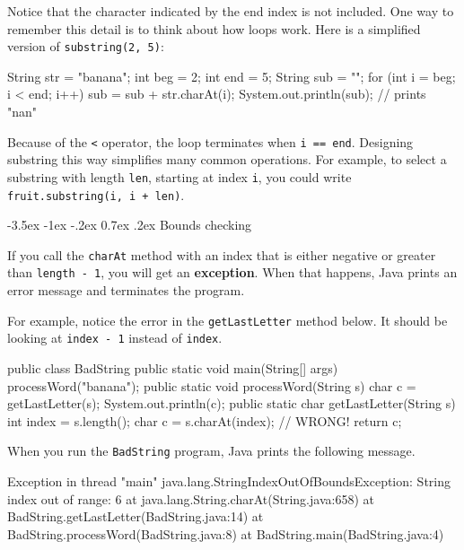 \documentclass[12pt]{book}
\makeatletter
\theoremstyle{exercise}
\newcommand{\java}[1]{\verb"#1"}
\renewcommand{\section}{\@startsection {section}{1}{\z@}%
    {-3.5ex \@plus -1ex \@minus -.2ex}%
    {0.7ex \@plus.2ex}%
    {\normalfont\Large\bfseries}}
\newcommand{\java}[1]{\lstinline{#1}} %
\makeatother
\begin{document}
Notice that the character indicated by the end index is not included.
One way to remember this detail is to think about how loops work.
Here is a simplified version of \java{substring(2, 5)}:

\begin{code}
    String str = "banana";
    int beg = 2;
    int end = 5;
    String sub = "";
    for (int i = beg; i < end; i++) {
        sub = sub + str.charAt(i);
    }
    System.out.println(sub);  // prints "nan"
\end{code}

Because of the \java{<} operator, the loop terminates when \java{i == end}.
Designing substring this way simplifies many common operations.
For example, to select a substring with length \java{len}, starting at index \java{i}, you could write \java{fruit.substring(i, i + len)}.


\section{Bounds checking}
\label{StringIndexOutOfBounds}


If you call the \java{charAt} method with an index that is either negative or greater than \java{length - 1}, you will get an {\bf exception}.
When that happens, Java prints an error message and terminates the program.

For example, notice the error in the \java{getLastLetter} method below.
It should be looking at \java{index - 1} instead of \java{index}.

\begin{code}
public class BadString {
    public static void main(String[] args) {
        processWord("banana");
    }
    public static void processWord(String s) {
        char c = getLastLetter(s);
        System.out.println(c);
    }
    public static char getLastLetter(String s) {
        int index = s.length();
        char c = s.charAt(index);  // WRONG!
        return c;
    }
}
\end{code}

When you run the \java{BadString} program, Java prints the following message.

\begin{small}
\begin{stdout}
Exception in thread "main" java.lang.StringIndexOutOfBoundsException:
String index out of range: 6
    at java.lang.String.charAt(String.java:658)
    at BadString.getLastLetter(BadString.java:14)
    at BadString.processWord(BadString.java:8)
    at BadString.main(BadString.java:4)
\end{stdout}
\end{small}
\end{document}
